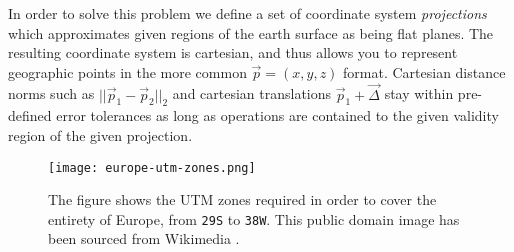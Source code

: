 In order to solve this problem we define a set of coordinate system \textit{projections} which approximates given regions of the earth surface as being flat planes.
The resulting coordinate system is cartesian, and thus allows you to represent geographic points in the more common $\vec{p} = (x, y, z)$ format.
Cartesian distance norms such as $||\vec{p}_1 - \vec{p}_2||_2$ and cartesian translations $\vec{p}_1 + \vec{\Delta}$ stay within pre-defined error tolerances as long as operations are contained to the given validity region of the given projection.

\begin{figure}[H]
  \centering
  \texttt{[image: europe-utm-zones.png]}
  \caption{
    The figure shows the UTM zones required in order to cover the entirety of Europe, from \texttt{29S} to \texttt{38W}.
    This public domain image has been sourced from Wikimedia \cite{wiki:europe_utm_zones}.
  }
\end{figure}
